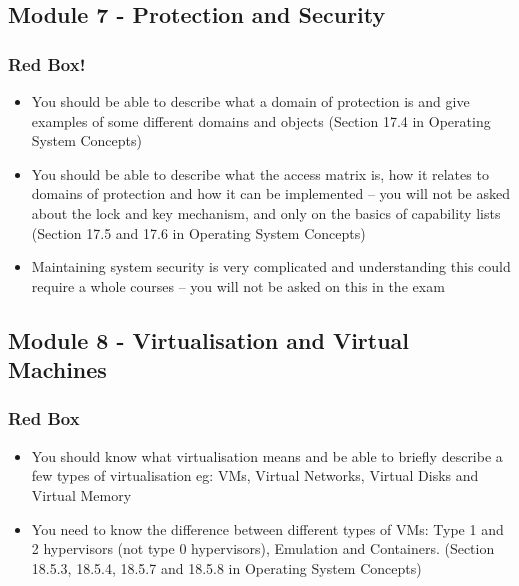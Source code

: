 \documentclass{article}
\begin{document}
\subsection{Module 7 - Protection and Security}
\subsubsection{Red Box!}
\begin{itemize}
    \item You should be able to describe what a domain of protection is and give examples of some different domains and
    objects (Section 17.4 in Operating System Concepts)
    \item You should be able to describe what the access matrix is, how it relates to domains of protection and how it can be implemented – you will not be asked about
    the lock and key mechanism, and only on the basics of capability lists (Section 17.5 and 17.6 in Operating System Concepts)
    \item Maintaining system security is very complicated and understanding this could require a whole courses – you will
    not be asked on this in the exam
\end{itemize}



\subsection{Module 8 - Virtualisation and Virtual Machines}
\subsubsection{Red Box}
\begin{itemize}
    \item You should know what virtualisation means and be able to briefly describe a few types of virtualisation eg: VMs,
    Virtual Networks, Virtual Disks and Virtual Memory
    \item You need to know the difference between different types of VMs: Type 1 and 2 hypervisors (not type 0
    hypervisors), Emulation and Containers. (Section 18.5.3, 18.5.4, 18.5.7 and 18.5.8 in Operating System Concepts)
\end{itemize}
\end{document}
